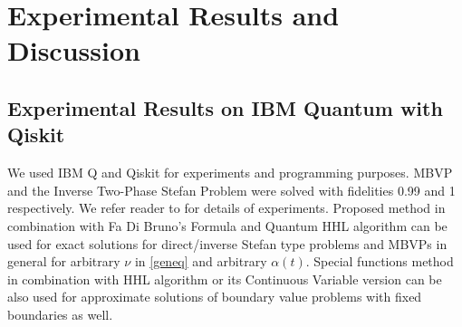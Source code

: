 \documentclass[review]{elsarticle}
\begin{document}




\section{Experimental Results and Discussion} 

\subsection{Experimental Results on IBM Quantum with Qiskit} 
We used IBM Q and Qiskit for experiments and programming purposes. MBVP and the Inverse Two-Phase Stefan Problem were solved with fidelities 0.99 and 1 respectively. We refer reader to \cite{SarFirst} for details of experiments. 
Proposed method in combination with Fa Di Bruno's Formula and Quantum HHL algorithm can be used for exact solutions for direct/inverse Stefan type problems and MBVPs in general for arbitrary $\nu$ in \ref{geneq} and arbitrary $\alpha(t)$.
Special functions method in combination with HHL algorithm or its Continuous Variable version \cite{Arrazola_2019} can be also used for approximate solutions of boundary value problems with fixed boundaries as well.       
\end{document}
